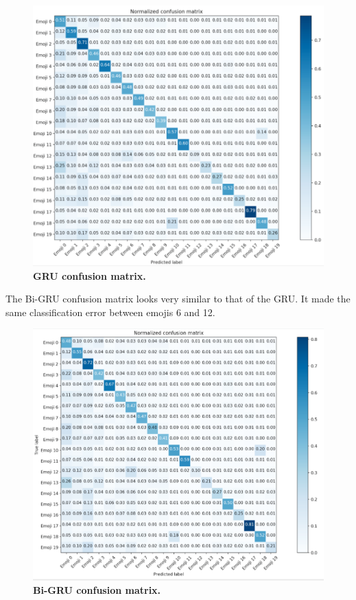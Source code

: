 \documentclass[11pt,a4paper]{article}
\begin{document}
	\begin{figure}[H]
		\centering\includegraphics[scale=0.25]{gru_confusion} 
		\caption{\textbf{GRU confusion matrix.}}
	\end{figure}
		The Bi-GRU confusion matrix looks very similar to that of the GRU. It made the same classification error between emojis 6 and 12.
	
	\begin{figure}[H]
		\centering\includegraphics[scale=0.23]{bgru_confusion} 
		\caption{\textbf{Bi-GRU confusion matrix.}}
	\end{figure}
\end{document}
